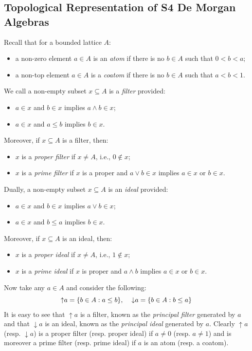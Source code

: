 \documentclass{amsart}
\theoremstyle{plain}
\theoremstyle{definition}
\begin{document}
\subsection{Topological Representation of S4 De Morgan Algebras}  
Recall that for a bounded lattice $A$:
\begin{itemize}
    \item a non-zero element $a\in A$ is an \emph{atom} if there is no $b\in A$ such that $0<b<a$; 
    \item a non-top element $a\in A$ is a \emph{coatom} if there is no $b\in A$ such that $a<b<1$.
\end{itemize}
 We call a non-empty subset $x\subseteq A$ is a \emph{filter} provided:
\begin{itemize}
    \item $a\in x$ and $b\in x$ implies $a\wedge b\in x$; 
    \item $a\in x$ and $a\leq b$ implies $b\in x$.
\end{itemize}
 Moreover, if $x\subseteq A$ is a filter, then:
 \begin{itemize}
     \item $x$ is a \emph{proper filter} if $x\not=A$, i.e., $0\not\in x$; 
     \item $x$ is a \emph{prime filter} if $x$ is a proper and $a\vee b\in x$ implies $a\in x$ or $b\in x$. 
 \end{itemize}
 Dually, a non-empty subset $x\subseteq A$ is an \emph{ideal} provided: 
 \begin{itemize}
     \item $a\in x$ and $b\in x$ implies $a\vee b\in x$; 
     \item $a\in x$ and $b\leq a$ implies $b\in x$. 
 \end{itemize}
 Moreover, if $x\subseteq A$ is an ideal, then: 
 \begin{itemize}
     \item $x$ is a \emph{proper ideal} if $x\not=A$, i.e., $1\not\in x$; 
     \item $x$ is a \emph{prime ideal} if $x$ is proper and $a\wedge b$ implies $a\in x$ or $b\in x$. 
 \end{itemize}
 Now take any $a\in A$ and consider the following:
 \[{\uparrow}a=\{b\in A:a\leq b\},\hspace{.4cm}{\downarrow}a=\{b\in A:b\leq a\}\]
 It is easy to see that ${\uparrow}a$ is a filter, known as the \emph{principal filter} generated by $a$ and that ${\downarrow}a$ is an ideal, known as the \emph{principal ideal} generated by $a$. Clearly ${\uparrow}a$ (resp. ${\downarrow}a$) is a proper filter (resp. proper ideal) if $a\not=0$ (resp. $a\not=1$) and is moreover a prime filter (resp. prime ideal) if $a$ is an atom (resp. a coatom).   
\end{document}

